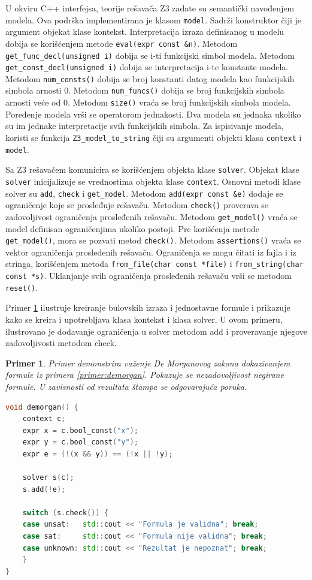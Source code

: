 \documentclass[12pt,oneside]{memoir}
\newtheorem{primer}{Primer}
\begin{document}
U okviru C++ interfejsa, teorije rešavača Z3 zadate su semantički navođenjem modela. Ova podrška implementirana je klasom \texttt{model}. Sadrži konstruktor čiji je argument objekat klase kontekst. Interpretacija izraza definisanog u modelu dobija se korišćenjem metode \texttt{eval(expr const \&n)}. Metodom \texttt{get\_func\_decl(unsigned i)} dobija se i-ti funkcijski simbol modela.  
Metodom \texttt{get\_const\_decl(unsigned i)} dobija se interpretacija i-te konstante modela. Metodom \texttt{num\_consts()} dobija se broj konstanti datog modela kao funkcijskih simbola arnosti 0. Metodom \texttt{num\_funcs()} dobija se broj funkcijskih simbola arnosti veće od 0.  Metodom \texttt{size()} vraća se broj funkcijskih simbola modela. Poređenje modela vrši se operatorom jednakosti. Dva modela su jednaka ukoliko su im jednake interpretacije svih funkcijskih simbola. Za ispisivanje modela, koristi se funkcija \texttt{Z3\_model\_to\_string} čiji su argumenti objekti klasa \texttt{context} i \texttt{model}.\par 


Sa Z3 rešavačem komunicira se korišćenjem objekta klase \texttt{solver}. Objekat klase \texttt{solver} inicijalizuje se vrednostima objekta klase \texttt{context}. Osnovni metodi klase solver su \texttt{add}, \texttt{check} i \texttt{get\_model}. Metodom \texttt{add(expr const \&e)} dodaje se ograničenje koje se prosleđuje rešavaču. Metodom \texttt{check()} proverava se zadovoljivost ograničenja prosleđenih rešavaču. Metodom \texttt{get\_model()} vraća se model definisan ograničenjima ukoliko postoji. Pre korišćenja metode \texttt{get\_model()}, mora se pozvati metod \texttt{check()}. Metodom \texttt{assertions()} vraća se vektor ograničenja prosleđenih rešavaču. Ograničenja se mogu čitati iz fajla i iz stringa, korišćenjem metoda \texttt{from\_file(char const *file)} i \texttt{from\_string(char const *s)}. Uklanjanje svih ograničenja prosleđenih rešavaču vrši se metodom \texttt{reset()}. \par

Primer \ref{ex1} ilustruje kreiranje bulovskih izraza i jednostavne formule i prikazuje kako se kreira i upotrebljava klasa kontekst i klasa solver. U ovom primeru, ilustrovano je dodavanje ograničenja u solver metodom add i proveravanje njegove zadovoljivosti metodom check. 

\begin{primer} \label{ex1} Primer demonstrira važenje De Morganovog zakona dokazivanjem formule iz primera \ref{primer:demorgan}. Pokazuje se nezadovoljivost negirane formule. U zavisnosti od rezultata štampa se odgovarajuća poruka.
\begin{lstlisting}[language=C++]
void demorgan() {
    context c;
    expr x = c.bool_const("x");
    expr y = c.bool_const("y");
    expr e = (!(x && y)) == (!x || !y);
    
    solver s(c);
    s.add(!e);

    switch (s.check()) {
    case unsat:   std::cout << "Formula je validna"; break;
    case sat:     std::cout << "Formula nije validna"; break;
    case unknown: std::cout << "Rezultat je nepoznat"; break;
    }
}
\end{lstlisting}
\end{primer}
\end{document}
